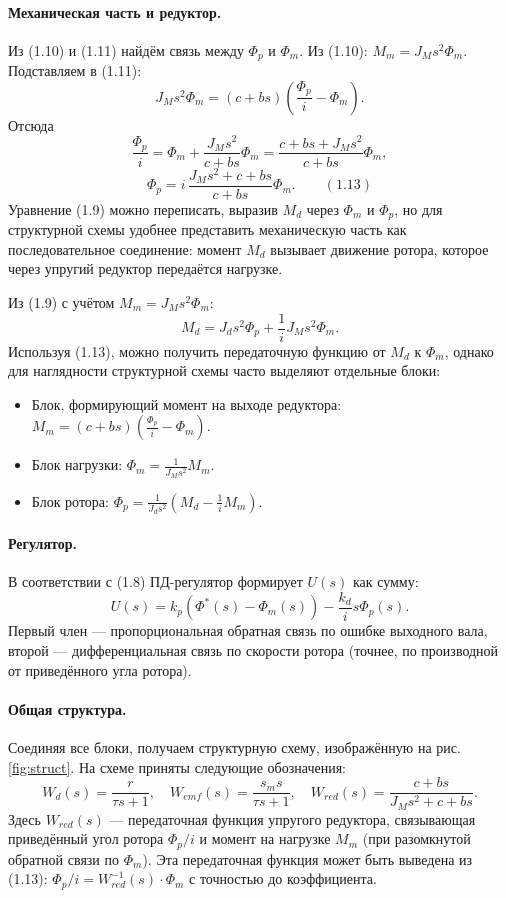 \documentclass[a4paper, 14pt]{extarticle}
\begin{document}
    \paragraph{Механическая часть и редуктор.}
    Из (1.10) и (1.11) найдём связь между $\Phi_p$ и $\Phi_m$. Из (1.10): $M_m = J_M s^2 \Phi_m$. Подставляем в (1.11):
    \[
    J_M s^2 \Phi_m = (c+bs)\left(\frac{\Phi_p}{i} - \Phi_m\right).
    \]
    Отсюда
    \[
    \frac{\Phi_p}{i} = \Phi_m + \frac{J_M s^2}{c+bs} \Phi_m = \frac{c+bs + J_M s^2}{c+bs} \Phi_m,
    \]
    \[
    \Phi_p = i\,\frac{J_M s^2 + c+bs}{c+bs} \Phi_m. \qquad (1.13)
    \]
    Уравнение (1.9) можно переписать, выразив $M_d$ через $\Phi_m$ и $\Phi_p$, но для структурной схемы удобнее представить механическую часть как последовательное соединение: момент $M_d$ вызывает движение ротора, которое через упругий редуктор передаётся нагрузке.

    Из (1.9) с учётом $M_m = J_M s^2 \Phi_m$:
    \[
    M_d = J_d s^2 \Phi_p + \frac{1}{i} J_M s^2 \Phi_m.
    \]
    Используя (1.13), можно получить передаточную функцию от $M_d$ к $\Phi_m$, однако для наглядности структурной схемы часто выделяют отдельные блоки:
    \begin{itemize}
    \item Блок, формирующий момент на выходе редуктора: $M_m = (c+bs)\left(\frac{\Phi_p}{i} - \Phi_m\right)$.
    \item Блок нагрузки: $\Phi_m = \frac{1}{J_M s^2} M_m$.
    \item Блок ротора: $\Phi_p = \frac{1}{J_d s^2}\left(M_d - \frac{1}{i}M_m\right)$.
    \end{itemize}

    \paragraph{Регулятор.}
    В соответствии с (1.8) ПД-регулятор формирует $U(s)$ как сумму:
    \[
    U(s) = k_p \left(\Phi^*(s) - \Phi_m(s)\right) - \frac{k_d}{i} s \Phi_p(s).
    \]
    Первый член — пропорциональная обратная связь по ошибке выходного вала, второй — дифференциальная связь по скорости ротора (точнее, по производной от приведённого угла ротора).

    \paragraph{Общая структура.}
    Соединяя все блоки, получаем структурную схему, изображённую на рис. \ref{fig:struct}. На схеме приняты следующие обозначения:
    \[
    W_d(s) = \frac{r}{\tau s+1}, \quad
    W_{emf}(s) = \frac{s_m s}{\tau s+1}, \quad
    W_{red}(s) = \frac{c+bs}{J_M s^2 + c+bs}.
    \]
    Здесь $W_{red}(s)$ — передаточная функция упругого редуктора, связывающая приведённый угол ротора $\Phi_p/i$ и момент на нагрузке $M_m$ (при разомкнутой обратной связи по $\Phi_m$). Эта передаточная функция может быть выведена из (1.13): $\Phi_p/i = W_{red}^{-1}(s) \cdot \Phi_m$ с точностью до коэффициента.
\end{document}
